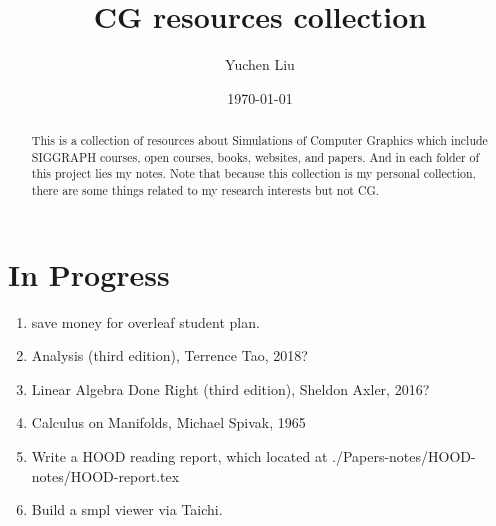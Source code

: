 \documentclass{article}
\title{CG resources collection}
\author{Yuchen Liu}
\date{\today}
\begin{document}
\setcounter{section}{-1}
\maketitle
\tableofcontents

\begin{abstract}
    This is a collection of resources about Simulations of Computer Graphics which include SIGGRAPH courses, open courses, books, websites, and papers. And in each folder of this project lies my notes. Note that because this collection is my personal collection, there are some things related to my research interests but not CG.
\end{abstract}

\section{In Progress}
\begin{enumerate}
    \item save money for overleaf student plan.
    \item Analysis (third edition), Terrence Tao, 2018?
    \item Linear Algebra Done Right (third edition), Sheldon Axler, 2016?
    \item Calculus on Manifolds, Michael Spivak, 1965
    \item Write a HOOD reading report, which located at ./Papers-notes/HOOD-notes/HOOD-report.tex
    \item Build a smpl viewer via Taichi.
\end{enumerate}

\newpage
\end{document}
